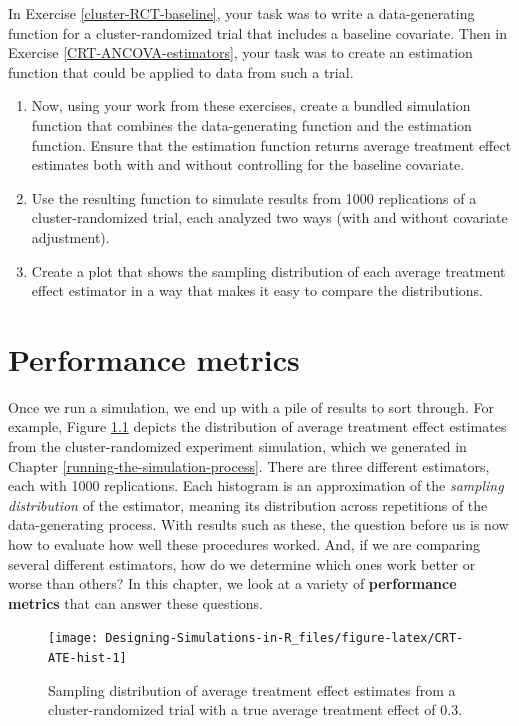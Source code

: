 \documentclass[
]{book}
\begin{document}
In Exercise \ref{cluster-RCT-baseline}, your task was to write a data-generating function for a cluster-randomized trial that includes a baseline covariate.
Then in Exercise \ref{CRT-ANCOVA-estimators}, your task was to create an estimation function that could be applied to data from such a trial.

\begin{enumerate}
\def\labelenumi{\arabic{enumi}.}
\item
  Now, using your work from these exercises, create a bundled simulation function that combines the data-generating function and the estimation function. Ensure that the estimation function returns average treatment effect estimates both with and without controlling for the baseline covariate.
\item
  Use the resulting function to simulate results from 1000 replications of a cluster-randomized trial, each analyzed two ways (with and without covariate adjustment).
\item
  Create a plot that shows the sampling distribution of each average treatment effect estimator in a way that makes it easy to compare the distributions.
\end{enumerate}

\chapter{Performance metrics}\label{performance-criteria}

Once we run a simulation, we end up with a pile of results to sort through.
For example, Figure \ref{fig:CRT-ATE-hist} depicts the distribution of average treatment effect estimates from the cluster-randomized experiment simulation, which we generated in Chapter \ref{running-the-simulation-process}.
There are three different estimators, each with 1000 replications.
Each histogram is an approximation of the \emph{sampling distribution} of the estimator, meaning its distribution across repetitions of the data-generating process.
With results such as these, the question before us is now how to evaluate how well these procedures worked. And, if we are comparing several different estimators, how do we determine which ones work better or worse than others? In this chapter, we look at a variety of \textbf{performance metrics} that can answer these questions.

\begin{figure}

{\centering \texttt{[image: Designing-Simulations-in-R\_files/figure-latex/CRT-ATE-hist-1]} 

}

\caption{Sampling distribution of average treatment effect estimates from a cluster-randomized trial with a true average treatment effect of 0.3.}\label{fig:CRT-ATE-hist}
\end{figure}
\end{document}
